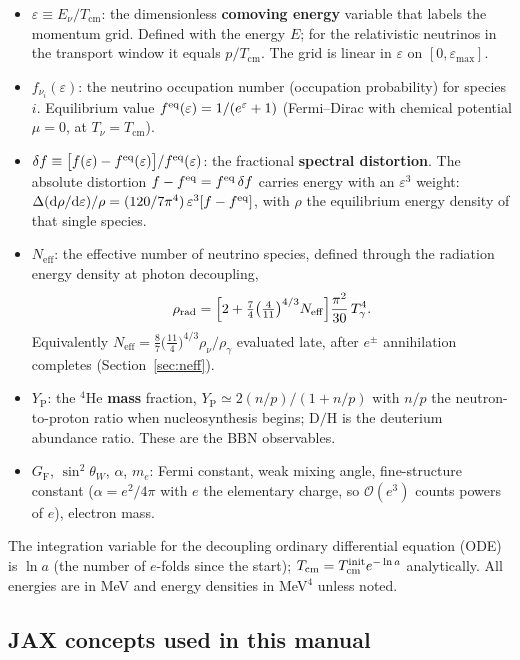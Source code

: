 \documentclass[11pt]{article}
\newcommand{\Neff}{N_{\mathrm{eff}}}
\newcommand{\Tcm}{T_{\mathrm{cm}}}
\newcommand{\Tg}{T_\gamma}
\newcommand{\Tnu}{T_\nu}
\newcommand{\eps}{\varepsilon}
\newcommand{\dd}{\mathrm{d}}
\newcommand{\GF}{G_{\mathrm F}}
\newcommand{\me}{m_e}
\newcommand{\rhonu}{\rho_\nu}
\newcommand{\rhog}{\rho_\gamma}
\newcommand{\Yp}{Y_{\mathrm P}}
\newcommand{\DoverH}{\mathrm{D/H}}
\begin{document}
\begin{itemize}[nosep]
\item $\eps\equiv E_\nu/\Tcm$: the dimensionless \textbf{comoving energy}
  variable that labels the momentum grid.  Defined with the energy $E$;
  for the relativistic neutrinos in the transport window it equals $p/\Tcm$.
  The grid is linear in $\eps$ on $[0,\eps_{\max}]$.
\item $f_{\nu_i}(\eps)$: the neutrino occupation number (occupation
  probability) for species $i$.  Equilibrium value
  $f^{\rm eq}(\eps)=1/(e^{\eps}+1)$ (Fermi--Dirac with chemical potential $\mu=0$,
  at $\Tnu=\Tcm$).
\item $\delta f\equiv\big[f(\eps)-f^{\rm eq}(\eps)\big]/f^{\rm eq}(\eps)$:
  the fractional \textbf{spectral distortion}.  The absolute distortion
  $f-f^{\rm eq}=f^{\rm eq}\,\delta f$ carries energy with an $\eps^3$ weight:
  $\Delta(\dd\rho/\dd\eps)/\rho=(120/7\pi^4)\,\eps^3[f-f^{\rm eq}]$, with $\rho$ the
  equilibrium energy density of that single species.
\item $\Neff$: the effective number of neutrino species, defined through the
  radiation energy density at photon decoupling,
  \begin{equation}
    \rho_{\rm rad}=\Big[2+\tfrac{7}{4}\big(\tfrac{4}{11}\big)^{4/3}\Neff\Big]
    \frac{\pi^2}{30}\,\Tg^4 .
    \label{eq:neffdef}
  \end{equation}
  Equivalently $\Neff=\frac{8}{7}\big(\frac{11}{4}\big)^{4/3}\rhonu/\rhog$
  evaluated late, after $e^\pm$ annihilation completes
  (Section~\ref{sec:neff}).
\item $\Yp$: the $^4$He \textbf{mass} fraction, $\Yp\simeq2(n/p)/(1+n/p)$ with $n/p$
  the neutron-to-proton ratio when nucleosynthesis begins;
  $\DoverH$ is the deuterium abundance ratio.  These are the BBN observables.
\item $\GF$, $\sin^2\theta_W$, $\alpha$, $\me$: Fermi constant, weak mixing
  angle, fine-structure constant ($\alpha=e^2/4\pi$ with $e$ the elementary charge,
  so $\mathcal O(e^3)$ counts powers of $e$), electron mass.
\end{itemize}

The integration variable for the decoupling ordinary differential equation (ODE)
is $\ln a$ (the number of
$e$-folds since the start); $\Tcm=\Tcm^{\rm init}e^{-\ln a}$ analytically.  All
energies are in MeV and energy densities in MeV$^4$ unless noted.

\subsection{JAX concepts used in this manual}
\label{sec:jaxprimer}
\end{document}
